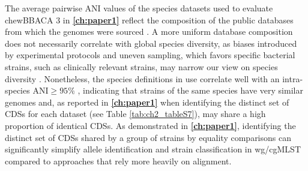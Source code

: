 The average pairwise \ac{ANI} values of the species datasets used to evaluate chewBBACA 3 in \textbf{\autoref{ch:paper1}} reflect the composition of the public databases from which the genomes were sourced \cite{oleary_reference_2016, blackwell_exploring_2021}. A more uniform database composition does not necessarily correlate with global species diversity, as biases introduced by experimental protocols and uneven sampling, which favors specific bacterial strains, such as clinically relevant strains, may narrow our view on species diversity \cite{isaac_bias_2015, albright_trait_2023, ross_characterizing_2013, boers_understanding_2019}. Nonetheless, the species definitions in use correlate well with an intra-species ANI$\geq95\%$ \cite{rodriguez-r_ani_2023, jain_high_2018, castillo-ramirez_road_nodate, konstantinidis_sequence-discrete_2023, rossello-mora_past_2015, murray_re-evaluating_2021}, indicating that strains of the same species have very similar genomes and, as reported in \textbf{\autoref{ch:paper1}} when identifying the distinct set of \ac{CDSs} for each dataset (see Table \ref{tab:ch2_tableS7}), may share a high proportion of identical \ac{CDSs}. As demonstrated in \textbf{\autoref{ch:paper1}}, identifying the distinct set of \ac{CDSs} shared by a group of strains by equality comparisons can significantly simplify allele identification and strain classification in \ac{wg/cgMLST} compared to approaches that rely more heavily on alignment.

